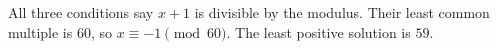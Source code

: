 All three conditions say $x+1$ is divisible by the modulus. Their least common multiple is $60$, so $x\equiv-1\pmod{60}$. The least positive solution is $\boxed{59}$.
